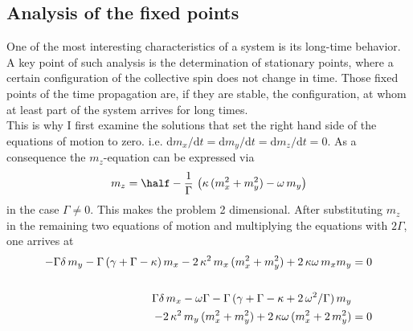 \subsection{Analysis of the fixed points}
One of the most interesting characteristics of a system is its long-time behavior. A key point of such analysis is the determination of stationary points, where a certain configuration of the collective spin does not change in time. Those fixed points of the time propagation are, if they are stable, the configuration, at whom at least part of the system arrives for long times. \\
This is why I first examine the solutions that set the right hand side of the equations of motion to zero. i.e. $\text{d}m_x/\text{d}t=\text{d}m_y/\text{d}t=\text{d}m_z/\text{d}t=0$. As a consequence the $m_z$-equation can be expressed via
\begin{align}
    m_z=\half-\frac{1}{\Gamma}\,\left(\kappa\,(m_x^2+ m_y^2)-\omega\,m_y  \right)
\end{align}
in the case $\Gamma\neq0$. This makes the problem 2 dimensional. After substituting $m_z$ in the remaining two equations of motion and multiplying the equations with $2\Gamma$, one arrives at
\begin{align}-\Gamma\delta\,m_y-\Gamma\,(\gamma+\Gamma-\kappa)\,m_x-2\,\kappa^2\,m_x\,( m_x^2+ m_y^2)+2\,\kappa\omega\,m_xm_y  &=0\notag\\\notag\\
    \Gamma\delta\,m_x-\omega\Gamma-\Gamma\,(\gamma+\Gamma-\kappa+2\,\omega^2/\Gamma)\,m_y&\notag\\
    -2\,\kappa^2\,m_y\,( m_x^2+ m_y^2)+2\,\kappa\omega\,(m_x^2+2\,m_y^2)  &=0
\end{align}
